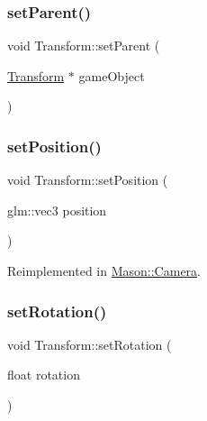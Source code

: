 \subsubsection{\texorpdfstring{set\+Parent()}{setParent()}}
{\footnotesize\ttfamily void Transform\+::set\+Parent (\begin{DoxyParamCaption}\item[{\hyperlink{class_mason_1_1_transform}{Transform} $\ast$}]{game\+Object }\end{DoxyParamCaption})\hspace{0.3cm}{\ttfamily [virtual]}}

\hypertarget{class_mason_1_1_transform_a740f389e20c0190c52bcb893aeaa0490}{}\label{class_mason_1_1_transform_a740f389e20c0190c52bcb893aeaa0490} 
\subsubsection{\texorpdfstring{set\+Position()}{setPosition()}}
{\footnotesize\ttfamily void Transform\+::set\+Position (\begin{DoxyParamCaption}\item[{glm\+::vec3}]{position }\end{DoxyParamCaption})\hspace{0.3cm}{\ttfamily [virtual]}}



Reimplemented in \hyperlink{class_mason_1_1_camera_a69f184af46d081b85209040bbe814cbb}{Mason\+::\+Camera}.

\hypertarget{class_mason_1_1_transform_aef821c00885810e430f61b274a6089db}{}\label{class_mason_1_1_transform_aef821c00885810e430f61b274a6089db} 
\subsubsection{\texorpdfstring{set\+Rotation()}{setRotation()}}
{\footnotesize\ttfamily void Transform\+::set\+Rotation (\begin{DoxyParamCaption}\item[{float}]{rotation }\end{DoxyParamCaption})\hspace{0.3cm}{\ttfamily [virtual]}}

